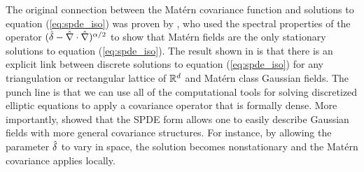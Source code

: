 The original connection between the Mat\'ern covariance function and solutions
to equation (\ref{eq:spde_iso}) was proven by
\cite{whittle_stationary_1954,whittle1963stochastic}, who
used the spectral properties of the operator $(\hat{\delta} -
\hat{\nabla}\cdot\hat{\nabla})^{\alpha/2}$ to show that Mat\'ern fields are the only
stationary solutions to equation (\ref{eq:spde_iso}).
The result shown in \citet{RSSB:RSSB777} is
that there is an explicit link between discrete solutions to equation
(\ref{eq:spde_iso}) for any triangulation or rectangular lattice of $\mathbb{R}^{d}$
and Mat\'ern class Gaussian fields.
The punch line is that we can use all of the computational tools for solving discretized
elliptic equations to apply a covariance operator that is formally dense.
More importantly, \citet{RSSB:RSSB777} showed that the SPDE form allows
one to easily describe Gaussian fields with more general covariance structures.
For instance, by allowing the parameter $\hat{\delta}$ to vary in space, the solution
becomes nonstationary and the Mat\'ern covariance applies locally.\\

